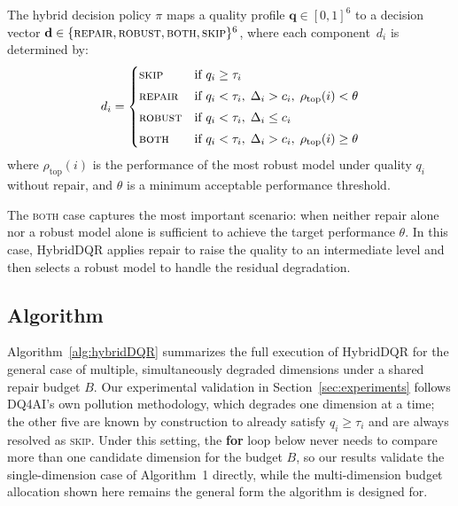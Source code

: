 \documentclass[runningheads]{llncs}
\begin{document}
\begin{definition}
The hybrid decision policy $\pi$ maps a quality profile
$\mathbf{q} \in [0,1]^6$ to a decision vector
$\mathbf{d} \in \{\textsc{repair},\textsc{robust},\textsc{both},\textsc{skip}\}^6$,
where each component~$d_i$ is determined by:
\begin{equation}
  d_i = \begin{cases}
    \textsc{skip}
      & \text{if } q_i \geq \tau_i \\[3pt]
    \textsc{repair}
      & \text{if } q_i < \tau_i,\;
        \Delta_i > c_i,\;
        \rho_{\mathrm{top}}(i) < \theta \\[3pt]
    \textsc{robust}
      & \text{if } q_i < \tau_i,\;
        \Delta_i \leq c_i \\[3pt]
    \textsc{both}
      & \text{if } q_i < \tau_i,\;
        \Delta_i > c_i,\;
        \rho_{\mathrm{top}}(i) \geq \theta
  \end{cases}
\end{equation}
where $\rho_{\text{top}}(i)$ is the performance of the most robust
model under quality $q_i$ without repair, and $\theta$ is a
minimum acceptable performance threshold.
\end{definition}

The \textsc{both} case captures the most important scenario:
when neither repair alone nor a robust model alone is sufficient
to achieve the target performance $\theta$.
In this case, HybridDQR applies repair to raise the quality to
an intermediate level and then selects a robust model to handle
the residual degradation.

\subsection{Algorithm}

Algorithm~\ref{alg:hybridDQR} summarizes the full execution of
HybridDQR for the general case of multiple, simultaneously
degraded dimensions under a shared repair budget $B$.
Our experimental validation in Section~\ref{sec:experiments}
follows DQ4AI's own pollution methodology, which degrades one
dimension at a time; the other five are known by construction to
already satisfy $q_i \geq \tau_i$ and are always resolved as
\textsc{skip}.
Under this setting, the \textbf{for} loop below never needs to
compare more than one candidate dimension for the budget $B$, so
our results validate the single-dimension case of Algorithm~1
directly, while the multi-dimension budget allocation shown here
remains the general form the algorithm is designed for.
\end{document}
